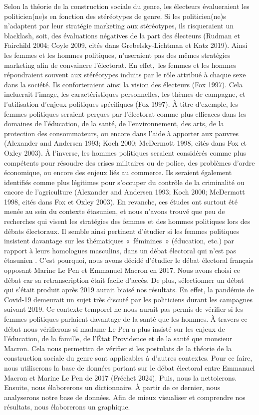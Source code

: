 \documentclass[
  letterpaper,
  DIV=11,
  numbers=noendperiod]{scrartcl}
\begin{document}
Selon la théorie de la construction sociale du genre, les électeurs
évalueraient les politicien(ne)s en fonction des stéréotypes de genre.
Si les politicien(ne)s n'adaptent par leur stratégie marketing aux
stéréotypes, ils risqueraient un blacklash, soit, des évaluations
négatives de la part des électeurs (Rudman et Fairchild 2004; Coyle
2009, cités dans Grebelsky-Lichtman et Katz 2019). Ainsi les femmes et
les hommes politiques, n'useraient pas des mêmes stratégies marketing
afin de convaincre l'électorat. En effet,~les femmes et les hommes
répondraient souvent aux stéréotypes induits par le rôle attribué à
chaque sexe dans la société. Ils conforteraient ainsi la vision des
électeurs (Fox 1997). Cela incluerait l'image, les caractéristiques
personnelles, les thèmes de campagne, et l'utilisation d'enjeux
politiques spécifiques (Fox 1997). À titre d'exemple, les femmes
politiques seraient perçues par l'électorat comme plus efficaces dans
les domaines de l'éducation, de la santé, de l'environnement, des arts,
de la protection des consommateurs, ou encore dans l'aide à apporter aux
pauvres (Alexander and Andersen 1993; Koch 2000; McDermott 1998, cités
dans Fox et Oxley 2003). À l'inverse, les hommes politiques seraient
considérés comme plus compétents pour résoudre des crises militaires ou
de police, des problèmes d'ordre économique, ou encore des enjeux liés
au commerce. Ils seraient également identifiés comme plus légitimes pour
s'occuper du contrôle de la criminalité ou encore de l'agriculture
(Alexander and Andersen 1993; Koch 2000; McDermott 1998, cités dans Fox
et Oxley 2003). En revanche, ces études ont surtout été menée au sein du
contexte étasunien, et nous n'avons trouvé que peu de recherches qui
visent les stratégies des femmes et des hommes politiques lors des
débats électoraux. Il semble ainsi pertinent d'étudier si les femmes
politiques insistent davantage sur les thématiques «~féminines~»
(éducation, etc.) par rapport à leurs homologues masculins, dans un
débat électoral qui n'est pas étasunien . C'est pourquoi, nous avons
décidé d'étudier le débat électoral français opposant Marine Le Pen et
Emmanuel Macron en 2017. Nous avons choisi ce débat car sa
retranscription était facile d'accès. De plus, sélectionner un débat qui
s'était produit après 2019 aurait biaisé nos résultats. En effet, la
pandémie de Covid-19 demeurait un sujet très discuté par les politiciens
durant les campagnes suivant 2019. Ce contexte temporel ne nous aurait
pas permis de vérifier si les femmes politiques parlaient davantage de
la santé que les hommes. À travers ce débat nous vérifierons si madame
Le Pen a plus insisté sur les enjeux de l'éducation, de la famille, de
l'État Providence et de la santé que monsieur Macron. Cela nous
permettra de vérifier si les postulats de la théorie de la construction
sociale du genre sont applicables à d'autres contextes. Pour ce faire,
nous utiliserons la base de données portant sur le débat électoral entre
Emmanuel Macron et Marine Le Pen de 2017 (Fréchet 2024). Puis, nous la
nettoierons. Ensuite, nous élaborerons un dictionnaire. À partir de ce
dernier, nous analyserons notre base de données. Afin de mieux
visualiser et comprendre nos résultats, nous élaborerons un graphique.~
\end{document}
